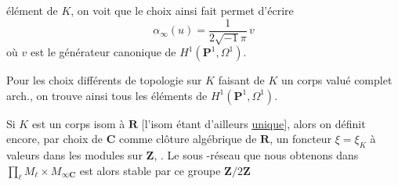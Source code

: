 élément de $K$, on voit que le choix ainsi fait permet d'écrire
\[
 \alpha_\infty(u)=\frac{1}{2\sqrt{-1}\pi}\,v
\]
où $v$ est le générateur canonique de $H^1(\mathbf P^1,\Omega^1)$.

Pour les choix différents de topologie sur $K$ faisant de $K$ un corps valué complet arch., on trouve ainsi tous les éléments  de $H^1(\mathbf P^1,\Omega^1)$.

Si $K$ est un corps  isom à $\mathbf R$ [l'isom étant d'ailleurs \uline{unique}], alors on définit encore, par choix de $\mathbf C$ comme  clôture algébrique de $\mathbf R$, un foncteur $\xi=\xi_K$ à valeurs dans les modules sur $\mathbf Z$,  . Le sous -réseau  que nous obtenons dans $\displaystyle\prod_\ell M_\ell\times M_{\infty\mathbf C}$  est alors stable par ce groupe $\mathbf Z/2\mathbf Z$

